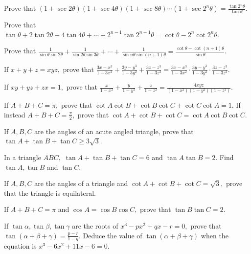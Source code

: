 \item Prove that $(1 + \sec 2\theta)(1 + \sec 4\theta)(1 + \sec 8\theta)\cdots(1 + \sec 2^n\theta) =
    \frac{\tan 2^n\theta}{\tan\theta}$.

\item Prove that $\tan\theta + 2\tan 2\theta + 4\tan 4\theta + \cdots + 2^{n - 1}\tan 2^{n - 1}\theta = \cot\theta -
    2^n\cot 2^n\theta$.

\item Prove that $\frac{1}{\sin\theta\sin 2\theta} + \frac{1}{\sin 2\theta\sin 3\theta} + \cdots + \frac{1}{\sin
    n\theta\sin(n + 1)\theta} = \frac{\cot\theta - \cot(n + 1)\theta}{\sin\theta}$.

\item If $x + y + z = xyz,$ prove that $\frac{3x - x^3}{1 - 3x^2} + \frac{3y - y^3}{1 - 3y^2} + \frac{3z -
    z^3}{1 - 3z^2} = \frac{3x - x^3}{1 - 3x^2}\cdot\frac{3y - y^3}{1 - 3y^2}\cdot\frac{3z - z^3}{1 - 3z^2}$.

\item If $xy + yz + zx = 1,$ prove that $\frac{x}{1 - x^2} + \frac{y}{1 - y^2} + \frac{z}{1 - z^2} = \frac{4xyz}{(1 -
    x^2)(1 - y^2)(1 - z^2)}$.

\item If $A + B + C = \pi,$ prove that $\cot A\cot B + \cot B\cot C + \cot C\cot A = 1.$ If instead $A + B + C =
    \frac{\pi}{2},$ prove that $\cot A + \cot B + \cot C = \cot A\cot B\cot C$.

\item If $A, B, C$ are the angles of an acute angled triangle, prove that $\tan A + \tan B + \tan C \geq 3\sqrt{3}$.

\item In a triangle $ABC,$ $\tan A + \tan B + \tan C = 6$ and $\tan A\tan B = 2.$ Find $\tan A, \tan B$ and $\tan C$.

\item If $A, B, C$ are the angles of a triangle and $\cot A + \cot B + \cot C = \sqrt{3},$ prove that the triangle is
    equilateral.

\item If $A + B + C = \pi$ and $\cos A = \cos B\cos C,$ prove that $\tan B\tan C = 2$.

\item If $\tan\alpha, \tan\beta, \tan\gamma$ are the roots of $x^3 - px^2 + qx - r = 0,$ prove that $\tan(\alpha +
    \beta + \gamma) = \frac{p - r}{1 - q}.$ Deduce the value of $\tan(\alpha + \beta + \gamma)$ when the equation is
    $x^3 - 6x^2 + 11x - 6 = 0$.

